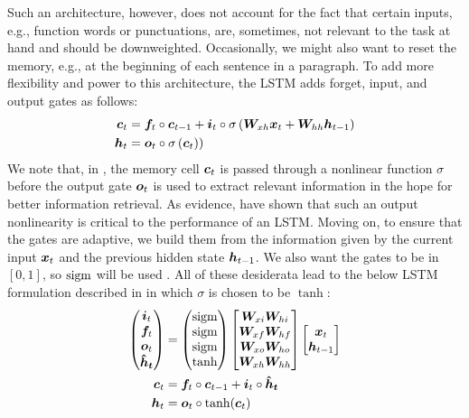 Such an architecture, however, does not account for the fact that certain inputs,
e.g., function words or punctuations,
are, sometimes, not relevant to the task at hand and should be downweighted.
Occasionally, we might also want
to reset the memory, e.g., at the beginning of each sentence in a
paragraph. To add more flexibility and power to this architecture, the LSTM adds
forget, input, and output gates as follows:
\begin{align}
\bm{c}_{t} &= \bm{f}_{t} \circ \bm{c}_{t-1} + \bm{i}_{t} \circ \sigma\left(\bm{W}_{xh}\bm{x}_{t} +
\bm{W}_{hh}\bm{h}_{t-1}\right) \\
\bm{h}_{t} &= \bm{o}_{t} \circ \sigma\left(\bm{c}_{t}\right) \label{e:lstm_output})
\end{align}
We note that, in , 
the memory cell $\bm{c}_{t}$ is passed through a nonlinear function $\sigma$ before the output
gate $\bm{o}_{t}$ is used to extract relevant information in the hope for better
information retrieval.
As evidence,  have
shown that such an output nonlinearity is critical to the performance of an LSTM. Moving on, to ensure that the
gates are adaptive, we build them from the information given by the current
input $\bm{x}_{t}$ and the previous hidden state $\bm{h}_{t-1}$. We also want the gates to be in $[0, 1]$,
so $\operatorname{sigm}$ will be used . All
of these desiderata lead to the below LSTM formulation described in
\cite{zaremba14} in which $\sigma$ is chosen to be $\tanh$:
\begin{align}
\begin{pmatrix}
\bm{i}_{t} \\
\bm{f}_{t} \\
\bm{o}_{t} \\
\mbox{\boldmath{$\hat{h}_t$}}
\end{pmatrix}
&= 
\begin{pmatrix}
\operatorname{sigm} \\
\operatorname{sigm} \\
\operatorname{sigm} \\
\tanh
\end{pmatrix}
\begin{bmatrix}
\bm{W}_{xi} \bm{W}_{hi} \\
\bm{W}_{xf} \bm{W}_{hf} \\
\bm{W}_{xo} \bm{W}_{ho} \\
\bm{W}_{xh} \bm{W}_{hh}
\end{bmatrix}
\begin{bmatrix}
  \bm{x}_{t} \\
  \bm{h}_{t-1}
\end{bmatrix} \label{e:lstm_detailed}\\
\bm{c}_{t} &= \bm{f}_{t} \circ \bm{c}_{t-1} + \bm{i}_{t} \circ \mbox{\boldmath{$\hat{h}_t$}} \label{e:lstm_cell}\\
\bm{h}_{t} &= \bm{o}_{t} \circ \tanh(\bm{c}_{t}) \label{e:lstm_detailed_output}
\end{align}

